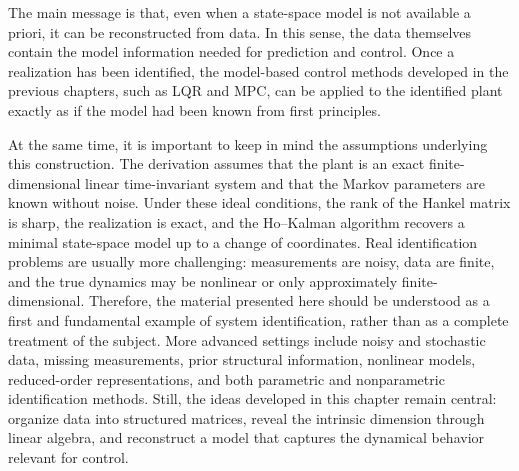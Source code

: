 The main message is that, even when a state-space model is not available a priori, it can be reconstructed from data. In this sense, the data themselves contain the model information needed for prediction and control. Once a realization has been identified, the model-based control methods developed in the previous chapters, such as LQR and MPC, can be applied to the identified plant exactly as if the model had been known from first principles.

At the same time, it is important to keep in mind the assumptions underlying this construction. The derivation assumes that the plant is an exact finite-dimensional linear time-invariant system and that the Markov parameters are known without noise. Under these ideal conditions, the rank of the Hankel matrix is sharp, the realization is exact, and the Ho--Kalman algorithm recovers a minimal state-space model up to a change of coordinates. Real identification problems are usually more challenging: measurements are noisy, data are finite, and the true dynamics may be nonlinear or only approximately finite-dimensional. Therefore, the material presented here should be understood as a first and fundamental example of system identification, rather than as a complete treatment of the subject. More advanced settings include noisy and stochastic data, missing measurements, prior structural information, nonlinear models, reduced-order representations, and both parametric and nonparametric identification methods. Still, the ideas developed in this chapter remain central: organize data into structured matrices, reveal the intrinsic dimension through linear algebra, and reconstruct a model that captures the dynamical behavior relevant for control.